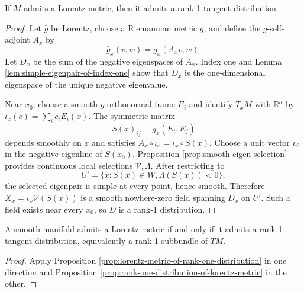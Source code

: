 \begin{proposition}
\label{prop:rank-one-distribution-of-lorentz-metric}
\leanok
{}
If $M$ admits a Lorentz metric, then it admits a rank-1 tangent distribution.
\end{proposition}

\begin{proof}
\leanok
{}
\sketch Let $\bar g$ be Lorentz, choose a Riemannian metric $g$, and define the
$g$-self-adjoint $A_x$ by
\[
\bar g_x(v,w)=g_x(A_xv,w).
\]
Let $D_x$ be the sum of the negative eigenspaces of $A_x$. Index one and Lemma
\ref{lem:simple-eigenpair-of-index-one} show that $D_x$ is the one-dimensional
eigenspace of the unique negative eigenvalue.

Near $x_0$, choose a smooth $g$-orthonormal frame $E_i$ and identify $T_xM$ with
$\mathbb R^n$ by $\iota_x(c)=\sum_i c_iE_i(x)$. The symmetric matrix
\[
S(x)_{ij}=\bar g_x(E_i,E_j)
\]
depends smoothly on $x$ and satisfies
$A_x\circ\iota_x=\iota_x\circ S(x)$. Choose a unit vector $v_0$ in the negative
eigenline of $S(x_0)$. Proposition \ref{prop:smooth-eigen-selection} provides
continuous local selections $\mathcal V,\Lambda$. After restricting to
\[
U'=\{x:S(x)\in W, \Lambda(S(x))<0\},
\]
the selected eigenpair is simple at every point, hence smooth. Therefore
$X_x=\iota_x\mathcal V(S(x))$ is a smooth nowhere-zero field spanning $D_x$ on
$U'$. Such a field exists near every $x_0$, so $D$ is a rank-1 distribution.
\end{proof}

\begin{theorem}
\label{thm:lorentz-metrics}
\leanok
{}
A smooth manifold admits a Lorentz metric if and only if it admits a rank-1
tangent distribution, equivalently a rank-1 subbundle of $TM$.
\end{theorem}

\begin{proof}
\leanok
{}
\sketch Apply Proposition \ref{prop:lorentz-metric-of-rank-one-distribution} in one
direction and Proposition \ref{prop:rank-one-distribution-of-lorentz-metric} in
the other.
\end{proof}

